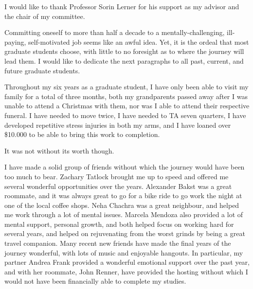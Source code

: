 \documentclass[12pt]{ucsddissertation}
\begin{document}

\tableofcontents
\listoffigures
\listoftables


\begin{acknowledgements}
I would like to thank Professor Sorin Lerner for his support as my advisor and
the chair of my committee.

Committing oneself to more than half a decade to a mentally-challenging,
ill-paying, self-motivated job seems like an awful idea.  Yet, it is the ordeal
that most graduate students choose, with little to no foresight as to where the
journey will lead them.  I would like to dedicate the next paragraphs to all
past, current, and future graduate students.

Throughout my six years as a graduate student, I have only been able to visit my
family for a total of three months, both my grandparents passed away after I was
unable to attend a Christmas with them, nor was I able to attend their
respective funeral.  I have needed to move twice, I have needed to TA seven
quarters, I have developed repetitive stress injuries in both my arms, and I
have loaned over \$10.000 to be able to bring this work to completion.

It was not without its worth though.

I have made a solid group of friends without which the journey would have been
too much to bear.  Zachary Tatlock brought me up to speed and offered me several
wonderful opportunities over the years.  Alexander Bakst was a great roommate,
and it was always great to go for a bike ride to go work the night at one of the
local coffee shops.  Neha Chachra was a great neighbour, and helped me work
through a lot of mental issues.  Marcela Mendoza also provided a lot of mental
support, personal growth, and both helped focus on working hard for several
years, and helped on rejuvenating from the worst grinds by being a great travel
companion.  Many recent new friends have made the final years of the journey
wonderful, with lots of music and enjoyable hangouts.  In particular, my partner
Andrea Frank provided a wonderful emotional support over the past year, and with
her roommate, John Renner, have provided the hosting without which I would not
have been financially able to complete my studies.


\end{acknowledgements}
\end{document}
